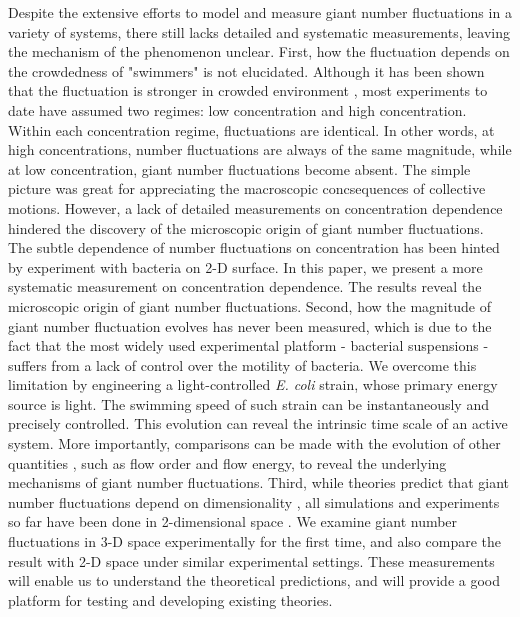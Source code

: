\documentclass[twocolumn,aps,prl,amsmath,amssymb,longbibliography]{revtex4-1}
\begin{document}
Despite the extensive efforts to model and measure giant number fluctuations in a variety of systems, there still lacks detailed and systematic measurements, leaving the mechanism of the phenomenon unclear. First, how the fluctuation depends on the crowdedness of "swimmers" is not elucidated. Although it has been shown that the fluctuation is stronger in crowded environment \cite{PhysRevE.95.020601, Zhang13626}, most experiments to date have assumed two regimes: low concentration and high concentration. Within each concentration regime, fluctuations are identical. In other words, at high concentrations, number fluctuations are always of the same magnitude, while at low concentration, giant number fluctuations become absent. The simple picture was great for appreciating the macroscopic concsequences of collective motions. However, a lack of detailed measurements on concentration dependence hindered the discovery of the microscopic origin of giant number fluctuations. The subtle dependence of number fluctuations on concentration has been hinted by experiment with bacteria on 2-D surface\cite{Zhang13626}. In this paper, we present a more systematic measurement on concentration dependence. The results reveal the microscopic origin of giant number fluctuations. Second, how the magnitude of giant number fluctuation evolves has never been measured, which is due to the fact that the most widely used experimental platform - bacterial suspensions - suffers from a lack of control over the motility of bacteria. We overcome this limitation by engineering a light-controlled \textit{E. coli} strain, whose primary energy source is light. The swimming speed of such strain can be instantaneously and precisely controlled. This evolution can reveal the intrinsic time scale of an active system. More importantly, comparisons can be made with the evolution of other quantities \cite{Peng2020}, such as flow order and flow energy, to reveal the underlying mechanisms of giant number fluctuations. Third, while theories predict that giant number fluctuations depend on dimensionality \cite{PhysRevLett.75.4326, PhysRevE.58.4828, EPL2003, doi:10.1146/annurev-conmatphys-031119-050752}, all simulations and experiments so far have been done in 2-dimensional space
\cite{PhysRevE.77.046113, PhysRevLett.123.218001, Schaller4488, PhysRevE.95.020601}. We examine giant number fluctuations in 3-D space experimentally for the first time, and also compare the result with 2-D space under similar experimental settings. These measurements will enable us to understand the theoretical predictions, and will provide a good platform for testing and developing existing theories.
\end{document}
